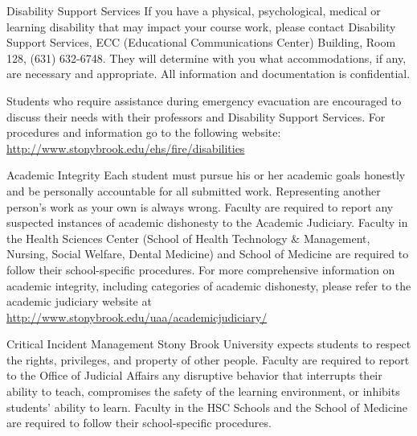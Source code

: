 \begin{frame}{Disability Support Services}
    If you have a physical, psychological, medical or learning disability that may impact your course work, please contact Disability Support Services, ECC (Educational Communications Center) Building, Room 128, (631) 632-6748. They will determine with you what accommodations, if any, are necessary and appropriate. All information and documentation is confidential.

    Students who require assistance during emergency evacuation are encouraged to discuss their needs with their professors and Disability Support Services.
    For procedures and information go to the following website:
    \url{http://www.stonybrook.edu/ehs/fire/disabilities}
\end{frame}

\begin{frame}{Academic Integrity}
    Each student must pursue his or her academic goals honestly and be personally accountable for all submitted work. Representing another person's work as your own is always wrong.  Faculty are required to report any suspected instances of academic dishonesty to the Academic Judiciary.  Faculty in the Health Sciences Center (School of Health Technology \& Management, Nursing, Social Welfare, Dental Medicine) and School of Medicine are required to follow their school-specific procedures. For more comprehensive information on academic integrity, including categories of academic dishonesty, please refer to the academic judiciary website at
    \url{http://www.stonybrook.edu/uaa/academicjudiciary/}
\end{frame}

\begin{frame}{Critical Incident Management}
    Stony Brook University expects students to respect the rights, privileges, and property of other people. Faculty are required to report to the Office of Judicial Affairs any disruptive behavior that interrupts their ability to teach, compromises the safety of the learning environment, or inhibits students' ability to learn.  Faculty in the HSC Schools and the School of Medicine are required to follow their school-specific procedures.
\end{frame}
